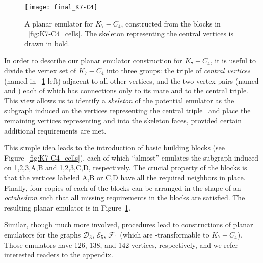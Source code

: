 \documentclass[envcountsect,envcountsame]{llncs}
\newenvironment{onlynoaccum}{}{}
\newcommand{\KK}{\ensuremath{{K}_7 - C_4}\xspace}
\newcommand{\DD}{\ensuremath{\mathcal{D}_3}\xspace}
\newcommand{\EEE}{\ensuremath{\mathcal{E}_5}\xspace}
\newcommand{\FF}{\ensuremath{\mathcal{F}_1}\xspace}
\begin{document}
\begin{figure}[tb]\centering
\texttt{[image: final\_K7-C4]}
\caption{A planar emulator for \KK, constructed from the blocks in
	\figurename~\ref{fig:K7-C4_cells}.
	The skeleton representing the central vertices is drawn in bold.}
\label{fig:K7-C4_final}
\end{figure}

In order to describe our planar emulator construction for  \KK,
it is useful to divide the vertex set of \KK into three groups:
the triple of \emph{central vertices} (named
 in \figurename~\ref{fig:K7-C4_final} left) adjacent to all 
other vertices, and the two vertex pairs (named  and )
each of which has connections only to its mate and to the central triple.
This view allows us to identify a \emph{skeleton} of the potential emulator
as the subgraph induced on the vertices representing the central
triple~ and place the remaining vertices representing  and
 into the skeleton faces, provided certain additional requirements are
met.

This simple idea leads to the introduction of basic building blocks (see
Figure~\ref{fig:K7-C4_cells}), each of which 
``almost'' emulates the subgraph induced on 1,2,3,A,B and 1,2,3,C,D, respectively.
The crucial property of the blocks is that the vertices labeled A,B or C,D have
all the required neighbors in place.
Finally, four copies of each of the blocks can be arranged in the shape of
an \emph{octahedron} such that all missing requirements in the blocks are
satisfied.
The resulting planar emulator is in Figure~\ref{fig:K7-C4_final}.

\begin{onlynoaccum}
Similar, though much more involved, procedures lead to constructions
of planar emulators for the graphs \DD, \EEE, \FF
(which are -transformable to \KK).
Those emulators have 126, 138, and 142 vertices, respectively,
and we refer interested readers to the appendix.
\end{onlynoaccum}
\end{document}
